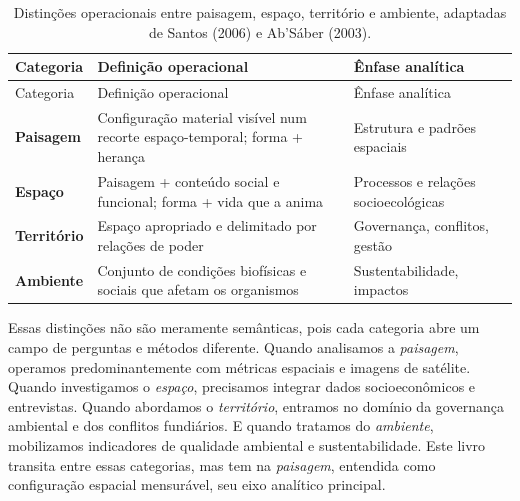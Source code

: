 \documentclass[
  portuguese,
  11pt,
  a4paper,
  open=any]{scrbook}
\begin{document}
\begin{longtable}[]{@{}
  >{\raggedright\arraybackslash}p{}
  >{\raggedright\arraybackslash}p{}
  >{\raggedright\arraybackslash}p{}@{}}
\caption{Distinções operacionais entre paisagem, espaço, território e
ambiente, adaptadas de Santos (2006) e Ab'Sáber
(2003).}\label{tbl-distincoes-operacionais}\tabularnewline
\toprule\noalign{}
\begin{minipage}[b]{\linewidth}\raggedright
Categoria
\end{minipage} & \begin{minipage}[b]{\linewidth}\raggedright
Definição operacional
\end{minipage} & \begin{minipage}[b]{\linewidth}\raggedright
Ênfase analítica
\end{minipage} \\
\midrule\noalign{}
\endfirsthead
\toprule\noalign{}
\begin{minipage}[b]{\linewidth}\raggedright
Categoria
\end{minipage} & \begin{minipage}[b]{\linewidth}\raggedright
Definição operacional
\end{minipage} & \begin{minipage}[b]{\linewidth}\raggedright
Ênfase analítica
\end{minipage} \\
\midrule\noalign{}
\endhead
\bottomrule\noalign{}
\endlastfoot
\textbf{Paisagem} & Configuração material visível num recorte
espaço-temporal; forma + herança & Estrutura e padrões espaciais \\
\textbf{Espaço} & Paisagem + conteúdo social e funcional; forma + vida
que a anima & Processos e relações socioecológicas \\
\textbf{Território} & Espaço apropriado e delimitado por relações de
poder & Governança, conflitos, gestão \\
\textbf{Ambiente} & Conjunto de condições biofísicas e sociais que
afetam os organismos & Sustentabilidade, impactos \\
\end{longtable}

Essas distinções não são meramente semânticas, pois cada categoria abre
um campo de perguntas e métodos diferente. Quando analisamos a
\emph{paisagem}, operamos predominantemente com métricas espaciais e
imagens de satélite. Quando investigamos o \emph{espaço}, precisamos
integrar dados socioeconômicos e entrevistas. Quando abordamos o
\emph{território}, entramos no domínio da governança ambiental e dos
conflitos fundiários. E quando tratamos do \emph{ambiente}, mobilizamos
indicadores de qualidade ambiental e sustentabilidade. Este livro
transita entre essas categorias, mas tem na \emph{paisagem}, entendida
como configuração espacial mensurável, seu eixo analítico principal.
\end{document}
